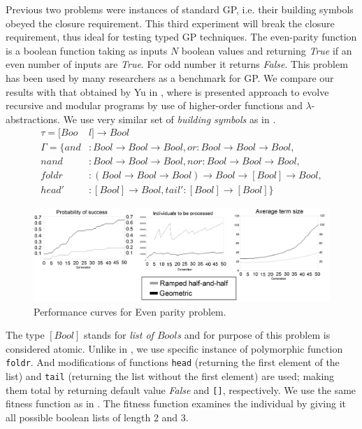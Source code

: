 \documentclass{llncs}
\newcommand{\ar}{\rightarrow\xspace}
\begin{document}
Previous two problems were instances of standard GP, i.e. their building symbols
obeyed the closure requirement. This third experiment will break the closure requirement, thus ideal for testing typed GP techniques. 
The even-parity function is a boolean function taking as inputs $N$
boolean values and returning \textit{True} if an even number of inputs 
are \textit{True}. For odd number it returns \textit{False}.
This problem has been used by many researchers
as a benchmark for GP. We compare our results with that obtained by Yu in \cite{yu01},
where is presented approach to evolve recursive and modular programs
by use of higher-order functions and $\lambda$-abstractions.
We use very similar set of \textit{building symbols} as in \cite{yu01}. 
\begin{align*}
\tau = [Boo&l] \ar Bool\\
\Gamma = \{
  and   &: Bool \ar Bool \ar Bool                              ,
  or    : Bool \ar Bool \ar Bool                              ,\\
  nand  &: Bool \ar Bool \ar Bool                              ,
  nor    : Bool \ar Bool \ar Bool                              ,\\
  foldr &: (Bool \ar Bool \ar Bool) \ar Bool \ar [Bool] \ar Bool ,\\
  head' &: [Bool] \ar Bool                                   ,
  tail' : [Bool] \ar [Bool]                              \}
\end{align*}
\begin{figure}[h!]
  \caption{Performance curves for Even parity problem.}
  \centering
    \includegraphics[scale=0.135]{imgs/EP_FINAL.png}
\end{figure}

The type $[Bool]$ stands for \textit{list of $Bool$s} and for purpose of
this problem is considered atomic.
Unlike in \cite{yu01}, we use specific instance of polymorphic 
function \texttt{foldr}. 
And modifications of functions \texttt{head} 
(returning the first element of the list) 
and \texttt{tail} (returning the list without the first element) are used; 
making them total by returning default value \textit{False}
and \texttt{[]}, respectively.
We use the same fitness function as in \cite{yu01}. 
The fitness function examines the individual by giving
it all possible boolean lists of length 2 and 3.
\end{document}
